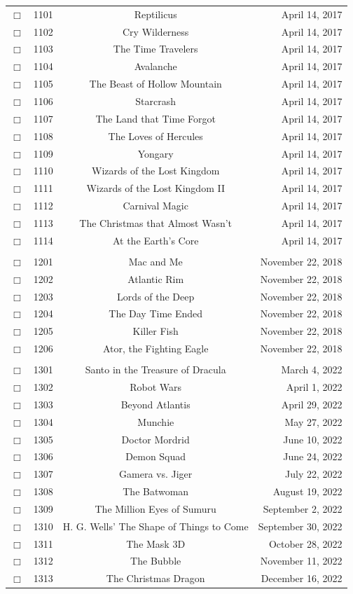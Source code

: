 \documentclass[12pt]{article}
\begin{document}
\begin{center}
\begin{longtable}[c]{cccr}
\\  %
$\Box$&1101&Reptilicus&April 14, 2017\\
$\Box$&1102&Cry Wilderness&April 14, 2017\\
$\Box$&1103&The Time Travelers&April 14, 2017\\
$\Box$&1104&Avalanche&April 14, 2017\\
$\Box$&1105&The Beast of Hollow Mountain&April 14, 2017\\
$\Box$&1106&Starcrash&April 14, 2017\\
$\Box$&1107&The Land that Time Forgot&April 14, 2017\\
$\Box$&1108&The Loves of Hercules&April 14, 2017\\
$\Box$&1109&Yongary&April 14, 2017\\
$\Box$&1110&Wizards of the Lost Kingdom&April 14, 2017\\
$\Box$&1111&Wizards of the Lost Kingdom II&April 14, 2017\\
$\Box$&1112&Carnival Magic&April 14, 2017\\
$\Box$&1113&The Christmas that Almost Wasn't&April 14, 2017\\
$\Box$&1114&At the Earth's Core&April 14, 2017\\  %

\\  %
$\Box$&1201&Mac and Me&November 22, 2018\\
$\Box$&1202&Atlantic Rim&November 22, 2018\\
$\Box$&1203&Lords of the Deep&November 22, 2018\\
$\Box$&1204&The Day Time Ended&November 22, 2018\\
$\Box$&1205&Killer Fish&November 22, 2018\\
$\Box$&1206&Ator, the Fighting Eagle&November 22, 2018\\  %

\\  %
$\Box$&1301&Santo in the Treasure of Dracula&March  4, 2022\\
$\Box$&1302&Robot Wars&April  1, 2022\\
$\Box$&1303&Beyond Atlantis&April 29, 2022\\
$\Box$&1304&Munchie&May 27, 2022\\
$\Box$&1305&Doctor Mordrid&June 10, 2022\\
$\Box$&1306&Demon Squad&June 24, 2022\\
$\Box$&1307&Gamera vs. Jiger&July 22, 2022\\
$\Box$&1308&The Batwoman&August 19, 2022\\
$\Box$&1309&The Million Eyes of Sumuru&September  2, 2022\\
$\Box$&1310&H. G. Wells' The Shape of Things to Come&September 30, 2022\\
$\Box$&1311&The Mask 3D&October 28, 2022\\
$\Box$&1312&The Bubble&November 11, 2022\\
$\Box$&1313&The Christmas Dragon&December 16, 2022\\  %


\end{longtable}
\end{center}
\end{document}
